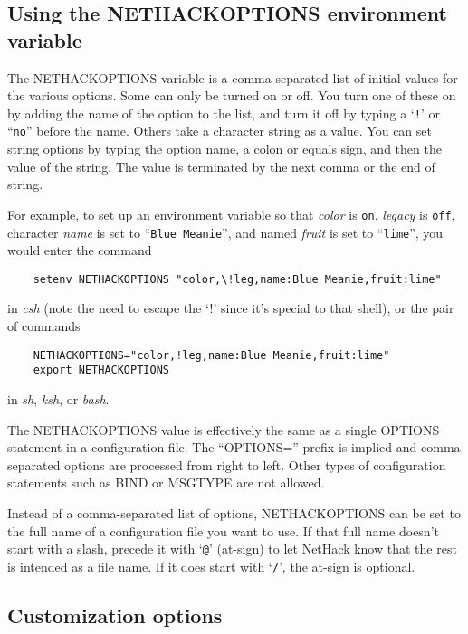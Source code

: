\subsection*{Using the NETHACKOPTIONS environment variable}

The NETHACKOPTIONS variable is a comma-separated list of initial
values for the various options.  Some can only be turned on or off.
You turn one of these on by adding the name of the option to the list,
and turn it off by typing a `{\tt !}' or ``{\tt no}'' before the name.
Others take a
character string as a value.  You can set string options by typing
the option name, a colon or equals sign, and then the value of the string.
The value is terminated by the next comma or the end of string.

For example, to set up an environment variable so that
{\it color\/} is {\tt on},
{\it legacy\/} is {\tt off},
character {\it name\/} is set to ``{\tt Blue Meanie}'',
and named {\it fruit\/} is set to ``{\tt lime}'',
you would enter the command
\begin{verbatim}
    setenv NETHACKOPTIONS "color,\!leg,name:Blue Meanie,fruit:lime"
\end{verbatim}

\nd in {\it csh}
(note the need to escape the `!' since it's special
to that shell), or the pair of commands
\begin{verbatim}
    NETHACKOPTIONS="color,!leg,name:Blue Meanie,fruit:lime"
    export NETHACKOPTIONS
\end{verbatim}

\nd in {\it sh}, {\it ksh}, or {\it bash}.

The NETHACKOPTIONS value is effectively the same as a single OPTIONS
statement in a configuration file.
The ``OPTIONS='' prefix is implied and comma separated options are
processed from right to left.
Other types of configuration statements such as BIND or MSGTYPE are
not allowed.

Instead of a comma-separated list of options,
NETHACKOPTIONS can be set to the full name of a configuration file you
want to use.
If that full name doesn't start with a slash, precede it with `{\tt @}'
(at-sign) to let NetHack know that the rest is intended as a file name.
If it does start with `{\tt /}', the at-sign is optional.

\subsection*{Customization options}

